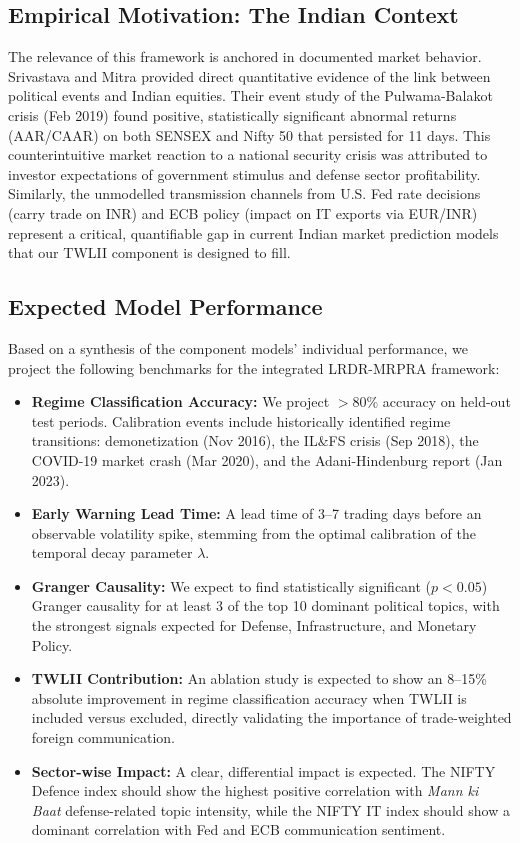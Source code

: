 \documentclass[11pt]{article}
\begin{document}
\subsection{Empirical Motivation: The Indian Context}
The relevance of this framework is anchored in documented market behavior. Srivastava and Mitra \cite{srivastava2019} provided direct quantitative evidence of the link between political events and Indian equities. Their event study of the Pulwama-Balakot crisis (Feb 2019) found positive, statistically significant abnormal returns (AAR/CAAR) on both SENSEX and Nifty 50 that persisted for 11 days. This counterintuitive market reaction to a national security crisis was attributed to investor expectations of government stimulus and defense sector profitability. Similarly, the unmodelled transmission channels from U.S. Fed rate decisions (carry trade on INR) and ECB policy (impact on IT exports via EUR/INR) represent a critical, quantifiable gap in current Indian market prediction models that our TWLII component is designed to fill.

\subsection{Expected Model Performance}
Based on a synthesis of the component models' individual performance, we project the following benchmarks for the integrated LRDR-MRPRA framework:
\begin{itemize}[leftmargin=*, itemsep=4pt, topsep=4pt]
    \item \textbf{Regime Classification Accuracy:} We project $>80\%$ accuracy on held-out test periods. Calibration events include historically identified regime transitions: demonetization (Nov 2016), the IL\&FS crisis (Sep 2018), the COVID-19 market crash (Mar 2020), and the Adani-Hindenburg report (Jan 2023).
    \item \textbf{Early Warning Lead Time:} A lead time of 3–7 trading days before an observable volatility spike, stemming from the optimal calibration of the temporal decay parameter $\lambda$.
    \item \textbf{Granger Causality:} We expect to find statistically significant ($p < 0.05$) Granger causality for at least 3 of the top 10 dominant political topics, with the strongest signals expected for Defense, Infrastructure, and Monetary Policy.
    \item \textbf{TWLII Contribution:} An ablation study is expected to show an 8–15\% absolute improvement in regime classification accuracy when TWLII is included versus excluded, directly validating the importance of trade-weighted foreign communication.
    \item \textbf{Sector-wise Impact:} A clear, differential impact is expected. The NIFTY Defence index should show the highest positive correlation with \textit{Mann ki Baat} defense-related topic intensity, while the NIFTY IT index should show a dominant correlation with Fed and ECB communication sentiment.
\end{itemize}
\end{document}
